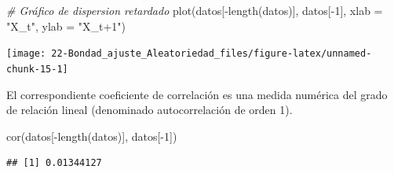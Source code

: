 \documentclass[
]{book}
\newenvironment{Shaded}{\begin{snugshade}}{\end{snugshade}}
\newcommand{\AttributeTok}[1]{\textcolor[rgb]{0.77,0.63,0.00}{#1}}
\newcommand{\CommentTok}[1]{\textcolor[rgb]{0.56,0.35,0.01}{\textit{#1}}}
\newcommand{\DecValTok}[1]{\textcolor[rgb]{0.00,0.00,0.81}{#1}}
\newcommand{\FunctionTok}[1]{\textcolor[rgb]{0.00,0.00,0.00}{#1}}
\newcommand{\NormalTok}[1]{#1}
\newcommand{\SpecialCharTok}[1]{\textcolor[rgb]{0.00,0.00,0.00}{#1}}
\newcommand{\StringTok}[1]{\textcolor[rgb]{0.31,0.60,0.02}{#1}}
\theoremstyle{break}
\theoremstyle{nonumberplain}
\begin{document}
\begin{Shaded}
\begin{Highlighting}[]
\CommentTok{\# Gráfico de dispersion retardado}
\FunctionTok{plot}\NormalTok{(datos[}\SpecialCharTok{{-}}\FunctionTok{length}\NormalTok{(datos)], datos[}\SpecialCharTok{{-}}\DecValTok{1}\NormalTok{], }\AttributeTok{xlab =} \StringTok{"X\_t"}\NormalTok{, }\AttributeTok{ylab =} \StringTok{"X\_t+1"}\NormalTok{)}
\end{Highlighting}
\end{Shaded}

\begin{center}\texttt{[image: 22-Bondad\_ajuste\_Aleatoriedad\_files/figure-latex/unnamed-chunk-15-1]} \end{center}

El correspondiente coeficiente de correlación es una medida numérica
del grado de relación lineal (denominado autocorrelación de orden 1).

\begin{Shaded}
\begin{Highlighting}[]
\FunctionTok{cor}\NormalTok{(datos[}\SpecialCharTok{{-}}\FunctionTok{length}\NormalTok{(datos)], datos[}\SpecialCharTok{{-}}\DecValTok{1}\NormalTok{])}
\end{Highlighting}
\end{Shaded}

\begin{verbatim}
## [1] 0.01344127
\end{verbatim}
\end{document}
